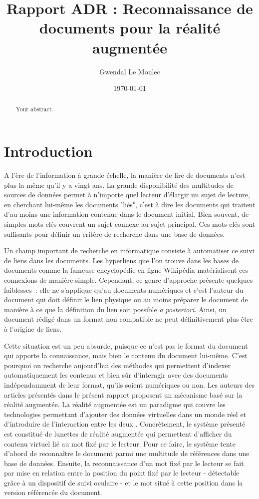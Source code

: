 \documentclass[a4paper]{article}
\title{Rapport ADR : Reconnaissance de documents pour la réalité augmentée}
\author{Gwendal Le Moulec}
\date{\today}
\begin{document}
\maketitle

\begin{abstract}
Your abstract.
\end{abstract}

\section{Introduction}

A l'ère de l'information à grande échelle, la manière de lire de documents n'est plus la même qu'il y a vingt ans. La grande disponibilité des multitudes de sources de données permet à n'importe quel lecteur d'élargir un sujet de lecture, en cherchant lui-même les documents "liés", c'est à dire les documents qui traitent d'au moins une information contenue dans le document initial. Bien souvent, de simples mots-clés couvrent un sujet connexe au sujet principal. Ces mots-clés sont suffisants pour définir un critère de recherche dans une base de données.

Un champ important de recherche en informatique consiste à automatiser ce suivi de liens dans les documents. Les hyperliens que l'on trouve dans les bases de documents comme la fameuse encyclopédie en ligne Wikipédia matérialisent ces connexions de manière simple. Cependant, ce genre d'approche présente quelques faiblesses~: elle ne s'applique qu'au documents numériques et c'est l'auteur du document qui doit définir le lien physique ou au moins préparer le document de manière à ce que la définition du lien soit possible \textit{a posteriori}. Ainsi, un document rédigé dans un format non compatible ne peut définitivement plus être à l'origine de liens.

Cette situation est un peu absurde, puisque ce n'est pas le format du document qui apporte la connaissance, mais bien le contenu du document lui-même. C'est pourquoi on recherche aujourd'hui des méthodes qui permettent d'indexer automatiquement les contenus et bien sûr d'interagir avec des documents indépendamment de leur format, qu'ils soient numériques ou non. Les auteurs des articles présentés dans le présent rapport proposent un mécanisme basé sur la réalité augmentée. La réalité augmentée est un paradigme qui couvre les technologies permettant d'ajouter des données virtuelles dans un monde réel et d'introduire de l'interaction entre les deux \cite{augmented-reality}. Concrètement, le système présenté est constitué de lunettes de réalité augmentée qui permettent d'afficher du contenu virtuel lié au mot fixé par le lecteur. Pour ce faire, le système tente d'abord de reconnaître le document parmi une multitude de références dans une base de données. Ensuite, la reconnaissance d'un mot fixé par le lecteur se fait par mise en relation entre la position du point fixé par le lecteur - détectable grâce à un dispositif de suivi oculaire - et le mot situé à cette position dans la version référencée du document.
\end{document}
